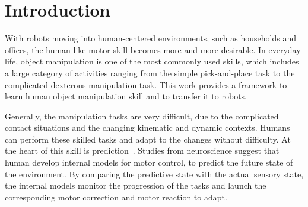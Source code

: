\section{Introduction}
\label{intro}
With robots moving into human-centered environments, such as households and offices, the human-like motor skill becomes more and more desirable. In everyday life, object manipulation is one of the most commonly used skills, which includes a large category of activities ranging from the simple pick-and-place task to the complicated dexterous manipulation task. This work provides a framework to learn human object manipulation skill and to transfer it to robots.


Generally, the manipulation tasks are very difficult, due to the complicated contact situations and the changing kinematic and dynamic contexts. Humans can perform these skilled tasks and adapt to the changes without difficulty. At the heart of this skill is prediction~\citep{flanagan2006control}. Studies from neuroscience suggest that human develop internal models for motor control, to predict the future state of the environment. By comparing the predictive state with the actual sensory state, the internal models monitor the progression of the tasks and launch the corresponding motor correction and motor reaction to adapt. %


